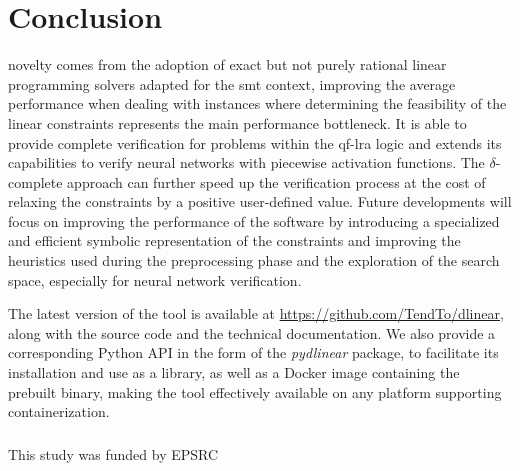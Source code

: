 \documentclass[runningheads]{llncs}
\begin{document}
\section{Conclusion}

\dlinear novelty comes from the adoption of exact but not purely rational linear programming solvers adapted for the \gls{smt} context, improving the average performance when dealing with instances where determining the feasibility of the linear constraints represents the main performance bottleneck.
It is able to provide complete verification for problems within the \gls{qf-lra} logic and extends its capabilities to verify neural networks with piecewise activation functions.
The $\delta$-complete approach can further speed up the verification process at the cost of relaxing the constraints by a positive user-defined value.
Future developments will focus on improving the performance of the software by introducing a specialized and efficient symbolic representation of the constraints and improving the heuristics used during the preprocessing phase and the exploration of the search space, especially for neural network verification.

The latest version of the tool is available at \url{https://github.com/TendTo/dlinear}, along with the source code and the technical documentation.
We also provide a corresponding Python API in the form of the \textit{pydlinear} package, to facilitate its installation and use as a library, as well as a Docker image containing the prebuilt binary, making the tool effectively available on any platform supporting containerization.

\begin{credits}
    \subsubsection{\ackname} This study was funded by EPSRC
\end{credits}




\end{document}
